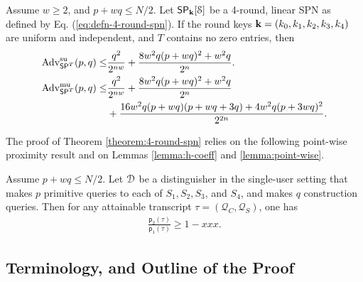 
\begin{theorem}
\label{theorem:4-round-spn}

Assume $w\geq2$, and $p+wq\leq N/2$. Let $\mathsf{SP}_{\mathbf{k}}[\mathcal{S}]$ be a 4-round, linear SPN as defined by Eq. (\ref{eq:defn-4-round-spn}). If the round keys $\mathbf{k}=(k_0,k_1,k_2,k_3,k_4)$ are uniform and independent, and $T$ contains no zero entries, then
%
\begin{align}
\operatorname{Adv}_{\mathsf{SP}^T}^{\mathrm{su}}(p, q) \leq& \frac{q^2}{2^{n w}} + \frac{8 w^2 q(p+wq)^2+w^2 q}{2^n}   .  
\notag   \\
\operatorname{Adv}_{\mathsf{SP}^T}^{\mathrm{mu}}(p, q) \leq& \frac{q^2}{2^{n w}} + \frac{8 w^2 q(p+wq)^2+w^2 q}{2^n}    \notag   \\
&+ \frac{16 w^2 q(p+w q)(p+w q +3 q)+4 w^2 q(p+3 wq)^2}{2^{2 n}}.
\notag
\end{align}
\end{theorem}
The proof of Theorem \ref{theorem:4-round-spn} relies on the following point-wise proximity result and on Lemmas \ref{lemma:h-coeff} and \ref{lemma:point-wise}.


\begin{lemma}
	\label{lemma:proximity-4-round}
	
	Assume $p+wq\leq N/2$. Let $\mathcal{D}$ be a distinguisher in the single-user setting that makes $p$ primitive queries to each of $S_1,S_2,S_3$, and $S_4$, and makes $q$ construction queries. Then for any attainable
	transcript $\tau=(\mathcal{Q}_C,\mathcal{Q}_S)$, one has
	\begin{align}
	\frac{\mathsf{p}_{2}(\tau)}{\mathsf{p}_{1}(\tau)}
	\geq 1 - xxx.
	\label{eq:bound-proximity-4-round}
	\end{align}
\end{lemma}




\subsection{Terminology, and Outline of the Proof}
\label{sec:proof-sketch-4-rounds}

